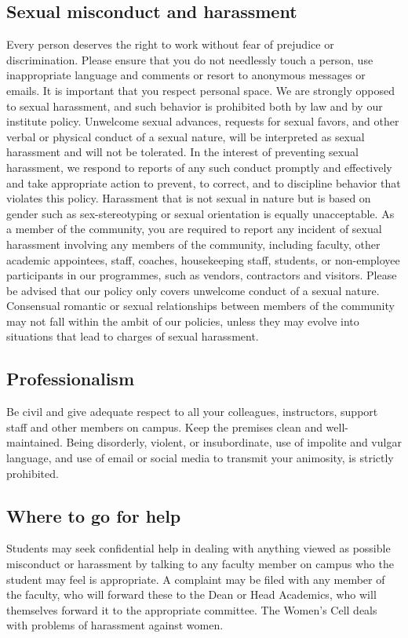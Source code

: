 \documentclass[a4paper,10pt]{article}
\begin{document}
\subsection{Sexual misconduct and harassment}
Every person deserves the right to work without fear
of prejudice or discrimination. Please ensure that you do not needlessly touch a person, use
inappropriate language and comments or resort to anonymous messages or emails. It is
important that you respect personal space. We are strongly opposed to sexual harassment,
and such behavior is prohibited both by law and by our institute policy. Unwelcome sexual
advances, requests for sexual favors, and other verbal or physical conduct of a sexual nature,
will be interpreted as sexual harassment and will not be tolerated. In the interest of
preventing sexual harassment, we respond to reports of any such conduct promptly and
effectively and take appropriate action to prevent, to correct, and to discipline behavior that
violates this policy. Harassment that is not sexual in nature but is based on gender such as
sex-stereotyping or sexual orientation is equally unacceptable. As a member of the
community, you are required to report any incident of sexual harassment involving any
members of the community, including faculty, other academic appointees, staff, coaches,
housekeeping staff, students, or non-employee participants in our programmes, such as
vendors, contractors and visitors. Please be advised that our policy only covers unwelcome
conduct of a sexual nature. Consensual romantic or sexual relationships between members
of the community may not fall within the ambit of our policies, unless they may evolve into
situations that lead to charges of sexual harassment.

\subsection{Professionalism}
Be civil and give adequate respect to all your colleagues, instructors,
support staff and other members on campus. Keep the premises clean and well-maintained.
Being disorderly, violent, or insubordinate, use of impolite and vulgar language, and use of
email or social media to transmit your animosity, is strictly prohibited.

\subsection{Where to go for help} Students may seek confidential help in dealing
with anything viewed as possible misconduct or harassment by talking to any
faculty member on campus who the student may feel is appropriate. A complaint
may be filed with any member of the faculty, who will forward these to the Dean
or Head Academics, who will themselves forward it to the appropriate committee.
The Women's Cell deals with problems of harassment against women.
\end{document}
